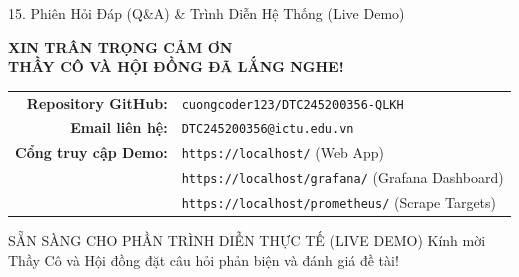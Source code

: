 \documentclass[aspectratio=169,10pt]{beamer}
\begin{document}
\begin{frame}{15. Phiên Hỏi Đáp (Q\&A) \& Trình Diễn Hệ Thống (Live Demo)}
    \begin{center}
        \Huge \textbf{\textcolor{techaccent}{XIN TRÂN TRỌNG CẢM ƠN}}\\[6pt]
        \Large \textbf{THẦY CÔ VÀ HỘI ĐỒNG ĐÃ LẮNG NGHE!}\\[14pt]
        
        \normalsize
        \begin{tabular}{rl}
            \textbf{Repository GitHub:} & \texttt{cuongcoder123/DTC245200356-QLKH} \\
            \textbf{Email liên hệ:} & \texttt{DTC245200356@ictu.edu.vn} \\
            \textbf{Cổng truy cập Demo:} & \texttt{https://localhost/} (Web App) \\
            & \texttt{https://localhost/grafana/} (Grafana Dashboard) \\
            & \texttt{https://localhost/prometheus/} (Scrape Targets)
        \end{tabular}
        
        \vspace{12pt}
        \begin{exampleblock}{\centering SẴN SÀNG CHO PHẦN TRÌNH DIỄN THỰC TẾ (LIVE DEMO)}
            Kính mời Thầy Cô và Hội đồng đặt câu hỏi phản biện và đánh giá đề tài!
        \end{exampleblock}
    \end{center}
\end{frame}
\end{document}

